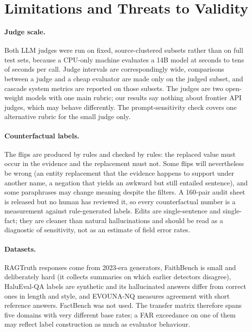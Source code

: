 \section{Limitations and Threats to Validity}
\label{sec:limitations}

\paragraph{Judge scale.} Both LLM judges were run on fixed, source-clustered subsets rather than on full test sets, because a CPU-only machine evaluates a 14B model at seconds to tens of seconds per call. Judge intervals are correspondingly wide, comparisons between a judge and a cheap evaluator are made only on the judged subset, and cascade system metrics are reported on those subsets. The judges are two open-weight models with one main rubric; our results say nothing about frontier API judges, which may behave differently. The prompt-sensitivity check covers one alternative rubric for the small judge only.

\paragraph{Counterfactual labels.} The flips are produced by rules and checked by rules: the replaced value must occur in the evidence and the replacement must not. Some flips will nevertheless be wrong (an entity replacement that the evidence happens to support under another name, a negation that yields an awkward but still entailed sentence), and some paraphrases may change meaning despite the filters. A 160-pair audit sheet is released but no human has reviewed it, so every counterfactual number is a measurement against rule-generated labels. Edits are single-sentence and single-fact; they are cleaner than natural hallucinations and should be read as a diagnostic of sensitivity, not as an estimate of field error rates.

\paragraph{Datasets.} RAGTruth responses come from 2023-era generators, FaithBench is small and deliberately hard (it collects summaries on which earlier detectors disagree), HaluEval-QA labels are synthetic and its hallucinated answers differ from correct ones in length and style, and EVOUNA-NQ measures agreement with short reference answers. FactBench was not used. The transfer matrix therefore spans five domains with very different base rates; a FAR exceedance on one of them may reflect label construction as much as evaluator behaviour.

